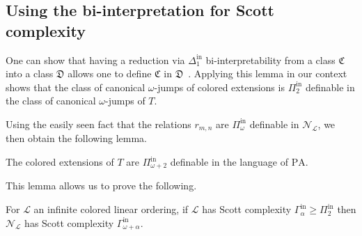 \documentclass[11pt]{amsart}
\newcommand{\N}{\mathcal{N}}
\newcommand{\mc}[1]{\mathcal{#1}}
\newcommand{\Pinf}[1]{\Pi^{\mathrm{in}}_{#1}}
\newcommand{\Dinf}[1]{\Delta^{\mathrm{in}}_{#1}}
\newcommand{\PA}{\mathrm{PA}}
\def\N{{\mathcal N}}
\theoremstyle{remark}
\begin{document}
\subsection{Using the bi-interpretation for Scott complexity}
One can show that having a reduction via $\Dinf{1}$ bi-interpretability from a class $\mathfrak C$ into a class $\mathfrak D$ allows one to define $\mathfrak C$ in $\mathfrak D$~\cite[Lemma VI.29]{montalban2021}. Applying this lemma in our context shows that the class of canonical $\omega$-jumps of colored extensions is $\Pinf{2}$ definable in the class of canonical $\omega$-jumps of $T$.

Using the easily seen fact that the relations $r_{m,n}$ are $\Pinf{\omega}$ definable in $\N_\mc{L}$, we then obtain the following lemma.

\begin{lemma}
    The colored extensions of $T$ are $\Pinf{\omega+2}$ definable in the language of $\PA$.
\end{lemma}

This lemma allows us to prove the following.

\begin{proposition}\label{prop:ComplexityTransfer}
	For $\mc L$ an infinite colored linear ordering, if $\mc{L}$ has Scott complexity $\Gamma^{\mathrm{in}}_\alpha\geq\Pinf{2}$ then $\mc{N}_{\mc{L}}$ has Scott complexity $\Gamma^{\mathrm{in}}_{\omega+\alpha}$.
\end{proposition}
\end{document}
